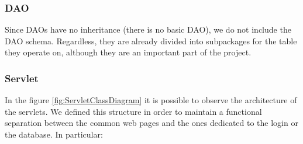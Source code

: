 \subsubsection*{DAO}

Since DAOs have no inheritance (there
is no basic DAO), we do not include the DAO schema.
Regardless, they are already divided into subpackages for the table they
operate on, although they are an important part of the project.


\subsubsection*{Servlet}

In the figure \ref{fig:ServletClassDiagram} it is possible to observe the 
architecture of the servlets.
We defined this structure in order to maintain a functional separation 
between the common web pages and the ones dedicated to the login or the database.
In particular: 
